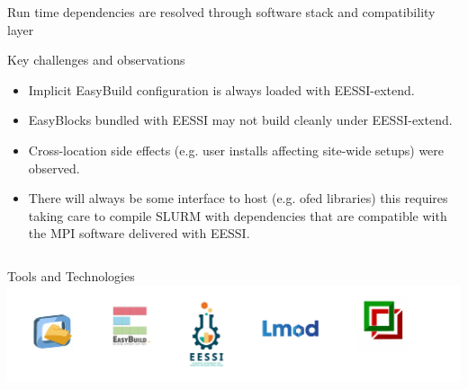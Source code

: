\documentclass[final]{beamer}
\begin{document}
\begin{frame}[t]
\begin{columns}[t]
\begin{column}{0.48\textwidth}
      \begin{block}{Run time dependencies are resolved through software stack and compatibility layer}
        
      \end{block}



      \begin{block} {Key challenges and observations}
          \begin{itemize}
            \item Implicit EasyBuild configuration is always loaded with EESSI-extend.
            \item EasyBlocks bundled with EESSI may not build cleanly under EESSI-extend.
            \item Cross-location side effects (e.g. user installs affecting site-wide setups) were observed.
            \item There will always be some interface to host (e.g. ofed
                libraries) this requires taking care to compile SLURM with
                  dependencies that are compatible with the MPI software
                  delivered with EESSI.
          \end{itemize}
      \end{block}

  \end{column}
\end{columns}

\vfill
\begin{block}{\centering \normalsize Tools and Technologies}
  \centering
  \includegraphics[width=0.66\paperwidth]{./include/logos.pdf}
\end{block}

\end{frame}
\end{document}
